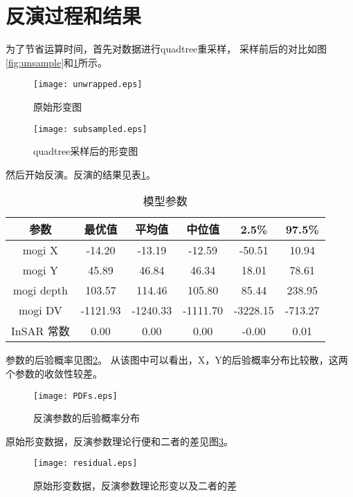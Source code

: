 \section{反演过程和结果}
为了节省运算时间，首先对数据进行quadtree重采样，
采样前后的对比如图\ref{fig:unsample}和\ref{fig:subsample}所示。
\begin{figure}[htp]
    \centering
    \begin{minipage}{0.9\textwidth}
        \centering
        \texttt{[image: unwrapped.eps]}
        \caption{原始形变图}
        \label{fig:unsample}
    \end{minipage}
    \qquad
    \begin{minipage}{0.9\textwidth}
        \centering
        \texttt{[image: subsampled.eps]}
        \caption{quadtree采样后的形变图}
        \label{fig:subsample}
    \end{minipage}
\end{figure}
然后开始反演。反演的结果见表\ref{tab:modelpar}。
\begin{table}[htb]
    \centering\small
    \caption{模型参数}
    \label{tab:modelpar}
    \begin{tabular}{@{}cccccc@{}}
    \toprule
    参数       & 最优值 & 平均值 & 中位值 & 2.5\% & 97.5\% \\ 
    \midrule
    mogi X    & -14.20 & -13.19 &-12.59 & -50.51 & 10.94 \\
    mogi Y     & 45.89 & 46.84 & 46.34 & 18.01 & 78.61\\
    mogi depth & 103.57 & 114.46 & 105.80 & 85.44 & 238.95\\
    mogi DV   & -1121.93 & -1240.33 & -1111.70 & -3228.15 & -713.27\\
    InSAR 常数 & 0.00 & 0.00 & 0.00 & -0.00 & 0.01\\
    \bottomrule
    \end{tabular}
\end{table}
参数的后验概率见图\ref{fig:pdf}。
从该图中可以看出，X，Y的后验概率分布比较散，这两个参数的收敛性较差。
\begin{figure}[htb]
    \centering
    \texttt{[image: PDFs.eps]}
    \caption{反演参数的后验概率分布}
    \label{fig:pdf}
\end{figure}
原始形变数据，反演参数理论行便和二者的差见图\ref{fig:residual}。
\begin{figure}[htb]
    \centering
    \texttt{[image: residual.eps]}
    \caption{原始形变数据，反演参数理论形变以及二者的差}
    \label{fig:residual}
\end{figure}
